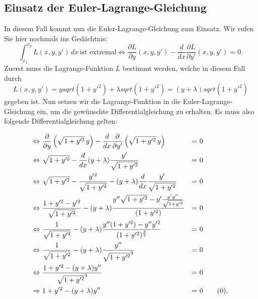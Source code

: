 \subsection{Einsatz der Euler-Lagrange-Gleichung
\label{kettenlinie:subsection:Einsatz der Euler-Lagrange-Gleichung}}
In diesem Fall kommt nun die Euler-Lagrange-Gleichung zum Einsatz.
Wir rufen Sie hier nochmals ins Gedächtnis:
\begin{equation}
	\int_{x_1}^{x_2} L(x, y, y') \, dx \, \text{ist extremal} \iff \frac{\partial L}{\partial y}(x, y, y') - \frac{d}{dx} \frac{\partial L}{\partial y'}(x, y, y') = 0.
\end{equation}
Zuerst muss die Lagrange-Funktion \(L\) bestimmt werden, welche in diesem Fall durch
\begin{equation}
	L(x, y, y')
	=
	y sqrt(1+y'^2) + \lambda sqrt(1+y'^2)
	=
	(y + \lambda) sqrt(1+y'^2)
\end{equation}
gegeben ist.
Nun setzen wir die Lagrange-Funktion in die Euler-Lagrange-Gleichung ein, um die gewünschte Differentialgleichung zu erhalten. Es muss also folgende Differentialgleichung gelten:

\begin{align*}
	\Leftrightarrow &\
	\frac{\partial}{\partial y} \left( \sqrt{1 + y'^2} \, y \right) - \frac{d}{dx} \frac{\partial}{\partial y'} \left( \sqrt{1 + y'^2} \, y \right) 
	&= &\
	0
	\\
	\Leftrightarrow &\
	\sqrt{1 + y'^2} - \frac{d}{dx} (y + \lambda) \dfrac{y'}{\sqrt{1 + y'^2}}
	&= &\
	0
	\\
	\Leftrightarrow &\
	\sqrt{1 + y'^2} - \frac{y'^2}{\sqrt{1 + y'^2}} - (y + \lambda) \frac{d}{dx} \frac{y'}{\sqrt{1 + y'^2}}
	&= &\
	0
	\\
	\Leftrightarrow &\
	\frac{1 + y'^2 - y'^2}{\sqrt{1 + y'^2}} - (y + \lambda) \frac{y'' \sqrt{1 + y'^2} - y' \frac{y' y''}{\sqrt{1 + y'^2}}}{(1 + y'^2)} 
	&= &\
	0
	\\
	\Leftrightarrow &\
	\frac{1}{\sqrt{1 + y'^2}} - (y + \lambda) \frac{y'' (1 + y'^2) - y''y'^2}{(1 + y'^2)^ \frac{3}{2}} 
	&= &\
	0
	\\
	\Leftrightarrow &\
	\frac{1}{\sqrt{1 + y'^2}} - (y + \lambda) \frac{y''}{\sqrt{1 + y'^2}^3} 
	&= &\
	0
	\\
	\Leftrightarrow &\
	\frac{1 + y'^2 - (y + \lambda) y''} {\sqrt{1 + y'^2}^3}
	&= &\
	0
	\\
	\Rightarrow &\
	1 + y'^2 - (y + \lambda) y''
	&= &\
	0 \label{kettenlinie:equation_1} \tag{\theequation} \stepcounter{equation}.
\end{align*}


